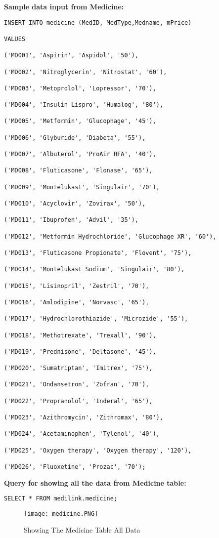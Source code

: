 \documentclass[11pt]{article}
\begin{document}
\textbf{Sample data input from Medicine:}
\begin{lstlisting}
INSERT INTO medicine (MedID, MedType,Medname, mPrice)

VALUES

('MD001', 'Aspirin', 'Aspidol', '50'),

('MD002', 'Nitroglycerin', 'Nitrostat', '60'),

('MD003', 'Metoprolol', 'Lopressor', '70'),

('MD004', 'Insulin Lispro', 'Humalog', '80'),

('MD005', 'Metformin', 'Glucophage', '45'),

('MD006', 'Glyburide', 'Diabeta', '55'),

('MD007', 'Albuterol', 'ProAir HFA', '40'),

('MD008', 'Fluticasone', 'Flonase', '65'),

('MD009', 'Montelukast', 'Singulair', '70'),

('MD010', 'Acyclovir', 'Zovirax', '50'),

('MD011', 'Ibuprofen', 'Advil', '35'),

('MD012', 'Metformin Hydrochloride', 'Glucophage XR', '60'),

('MD013', 'Fluticasone Propionate', 'Flovent', '75'),

('MD014', 'Montelukast Sodium', 'Singulair', '80'),

('MD015', 'Lisinopril', 'Zestril', '70'),

('MD016', 'Amlodipine', 'Norvasc', '65'),

('MD017', 'Hydrochlorothiazide', 'Microzide', '55'),

('MD018', 'Methotrexate', 'Trexall', '90'),

('MD019', 'Prednisone', 'Deltasone', '45'),

('MD020', 'Sumatriptan', 'Imitrex', '75'),

('MD021', 'Ondansetron', 'Zofran', '70'),

('MD022', 'Propranolol', 'Inderal', '65'),

('MD023', 'Azithromycin', 'Zithromax', '80'),

('MD024', 'Acetaminophen', 'Tylenol', '40'),

('MD025', 'Oxygen therapy', 'Oxygen therapy', '120'),

('MD026', 'Fluoxetine', 'Prozac', '70');
\end{lstlisting}

\textbf{Query for showing all the data from Medicine table: }
\begin{lstlisting}
SELECT * FROM medilink.medicine;
\end{lstlisting}
\begin{figure}[H]
    \centering
    \texttt{[image: medicine.PNG]}
    \caption{Showing The Medicine Table All Data}
    \label{fig:1}
\end{figure}
\end{document}
